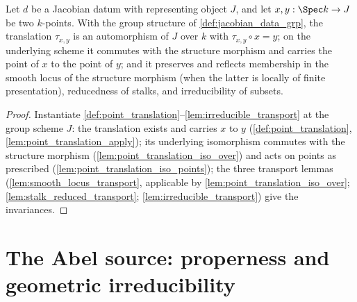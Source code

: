 \begin{corollary}
  \label{cor:jacobian_translation}
  \leanok
  Let \(d\) be a Jacobian datum with representing object \(J\), and let
  \(x, y : \Spec k \to J\) be two \(k\)-points. With the group structure of
  \ref{def:jacobian_data_grp}, the translation \(\tau_{x,y}\) is an
  automorphism of \(J\) over \(k\) with \(\tau_{x,y} \circ x = y\); on the
  underlying scheme it commutes with the structure morphism and carries the
  point of \(x\) to the point of \(y\); and it preserves and reflects
  membership in the smooth locus of the structure morphism (when the latter is
  locally of finite presentation), reducedness of stalks, and irreducibility
  of subsets.
\end{corollary}
\begin{proof}
  \leanok
  Instantiate \ref{def:point_translation}--\ref{lem:irreducible_transport} at
  the group scheme \(J\): the translation exists and carries \(x\) to \(y\)
  (\ref{def:point_translation}, \ref{lem:point_translation_apply}); its
  underlying isomorphism commutes with the structure morphism
  (\ref{lem:point_translation_iso_over}) and acts on points as prescribed
  (\ref{lem:point_translation_iso_points}); the three transport lemmas
  (\ref{lem:smooth_locus_transport}, applicable by
  \ref{lem:point_translation_iso_over}; \ref{lem:stalk_reduced_transport};
  \ref{lem:irreducible_transport}) give the invariances.
\end{proof}

\section{The Abel source: properness and geometric irreducibility}
\label{sec:abel_source}

